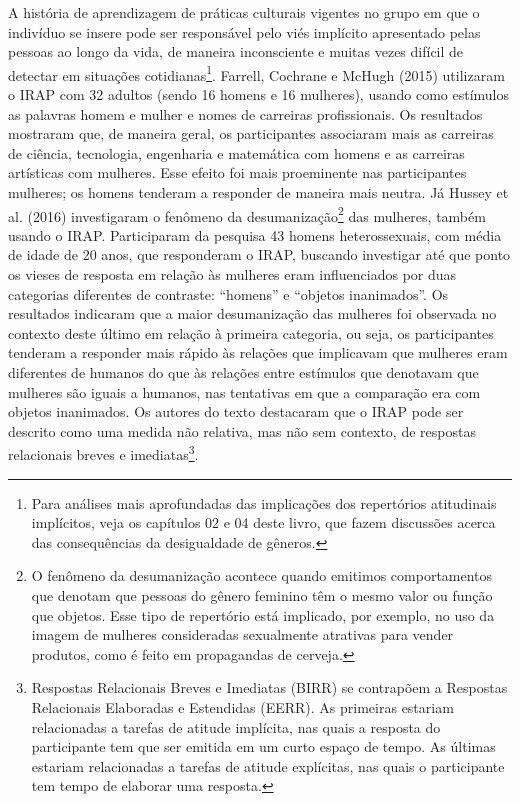 A história de aprendizagem de práticas culturais vigentes no grupo em que o indivíduo se insere pode ser responsável pelo viés implícito apresentado pelas pessoas ao longo da vida, de maneira inconsciente e muitas vezes difícil de detectar em situações cotidianas\footnote{Para análises mais aprofundadas das implicações dos repertórios atitudinais implícitos, veja os capítulos 02 e 04 deste livro, que fazem discussões acerca das consequências da desigualdade de gêneros.}. Farrell, Cochrane e McHugh (2015) utilizaram o IRAP com 32 adultos (sendo 16 homens e 16 mulheres), usando como estímulos as palavras homem e mulher e nomes de carreiras profissionais. Os resultados mostraram que, de maneira geral, os participantes associaram mais as carreiras de ciência, tecnologia, engenharia e matemática com homens e as carreiras artísticas com mulheres. Esse efeito foi mais proeminente nas participantes mulheres; os homens tenderam a responder de maneira mais neutra. Já Hussey et al. (2016) investigaram o fenômeno da desumanização\footnote{O fenômeno da desumanização acontece quando emitimos comportamentos que denotam que pessoas do gênero feminino têm o mesmo valor ou função que objetos. Esse tipo de repertório está implicado, por exemplo, no uso da imagem de mulheres consideradas sexualmente atrativas para vender produtos, como é feito em propagandas de cerveja.} das mulheres, também usando o IRAP. Participaram da pesquisa 43 homens heterossexuais, com média de idade de 20 anos, que responderam o IRAP, buscando investigar até que ponto os vieses de resposta em relação às mulheres eram influenciados por duas categorias diferentes de contraste: ``homens'' e ``objetos inanimados''. Os resultados indicaram que a maior desumanização das mulheres foi observada no contexto deste último em relação à primeira categoria, ou seja, os participantes tenderam a responder mais rápido às relações que implicavam que mulheres eram diferentes de humanos do que às relações entre estímulos que denotavam que mulheres são iguais a humanos, nas tentativas em que a comparação era com objetos inanimados. Os autores do texto destacaram que o IRAP pode ser descrito como uma medida não relativa, mas não sem contexto, de respostas relacionais breves e imediatas\footnote{Respostas Relacionais Breves e Imediatas (BIRR) se contrapõem a Respostas Relacionais Elaboradas e Estendidas (EERR). As primeiras estariam relacionadas a tarefas de atitude implícita, nas quais a resposta do participante tem que ser emitida em um curto espaço de tempo. As últimas estariam relacionadas a tarefas de atitude explícitas, nas quais o participante tem tempo de elaborar uma resposta.}. 

